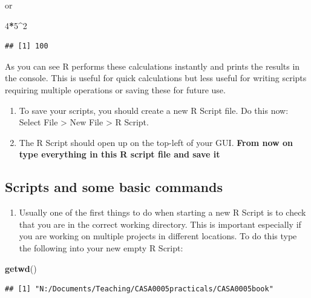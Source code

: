 \documentclass[]{book}
\newenvironment{Shaded}{\begin{snugshade}}{\end{snugshade}}
\newcommand{\DecValTok}[1]{\textcolor[rgb]{0.00,0.00,0.81}{#1}}
\newcommand{\KeywordTok}[1]{\textcolor[rgb]{0.13,0.29,0.53}{\textbf{#1}}}
\newcommand{\NormalTok}[1]{#1}
\newcommand{\OperatorTok}[1]{\textcolor[rgb]{0.81,0.36,0.00}{\textbf{#1}}}
\providecommand{\tightlist}{%
  \setlength{\itemsep}{0pt}\setlength{\parskip}{0pt}}
\begin{document}
or

\begin{Shaded}
\begin{Highlighting}[]
\DecValTok{4}\OperatorTok{*}\DecValTok{5}\OperatorTok{^}\DecValTok{2}
\end{Highlighting}
\end{Shaded}

\begin{verbatim}
## [1] 100
\end{verbatim}

As you can see R performs these calculations instantly and prints the results in the console. This is useful for quick calculations but less useful for writing scripts requiring multiple operations or saving these for future use.

\begin{enumerate}
\def\labelenumi{\arabic{enumi}.}
\setcounter{enumi}{1}
\item
  To save your scripts, you should create a new R Script file. Do this now: Select File \textgreater{} New File \textgreater{} R Script.
\item
  The R Script should open up on the top-left of your GUI. \textbf{From now on type everything in this R script file and save it}
\end{enumerate}

\hypertarget{scripts-and-some-basic-commands}{%
\subsection{Scripts and some basic commands}\label{scripts-and-some-basic-commands}}

\begin{enumerate}
\def\labelenumi{\arabic{enumi}.}
\setcounter{enumi}{3}
\tightlist
\item
  Usually one of the first things to do when starting a new R Script is to check that you are in the correct working directory. This is important especially if you are working on multiple projects in different locations. To do this type the following into your new empty R Script:
\end{enumerate}

\begin{Shaded}
\begin{Highlighting}[]
\KeywordTok{getwd}\NormalTok{()}
\end{Highlighting}
\end{Shaded}

\begin{verbatim}
## [1] "N:/Documents/Teaching/CASA0005practicals/CASA0005book"
\end{verbatim}
\end{document}
